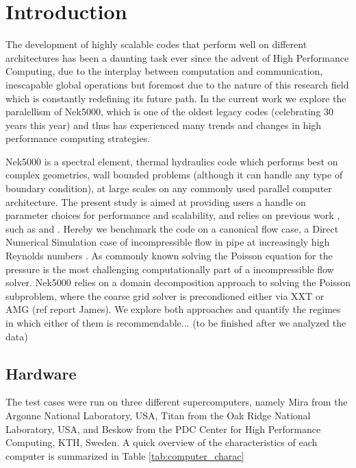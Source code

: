 \documentclass{sig-alternate}
\begin{document}
%
%

%
%
\printccsdesc



\section{Introduction}
The development of highly scalable codes that perform well on different architectures has been a daunting task ever since the advent of High Performance Computing, due to the interplay between computation and communication, inescapable global operations but foremost due to the nature of this research field which is constantly redefining its future path. In the current work we explore the paralellism of Nek5000, which is one of the oldest legacy codes (celebrating 30 years this year) and thus has experienced many trends and changes in high performance computing strategies.

Nek5000 is a spectral element, thermal hydraulics code which performs best on complex geometries, wall bounded problems (although it can handle any type of boundary condition), at large scales on any commonly used parallel computer architecture. The present study is aimed at providing users a handle on parameter choices for performance and scalability, and relies on previous work , such as \cite{fischer:scaling} and \cite{tufo:terascale}. Hereby we benchmark the code on a canonical flow case, a Direct Numerical Simulation case of incompressible flow in pipe at increasingly high Reynolds numbers \cite{Khoury2013}. As commonly known solving the Poisson equation for the pressure is the most challenging computationally part of a incompressible flow solver. Nek5000 relies on a domain decomposition approach to solving the Poisson subproblem, where the coarse grid solver is precondioned either via XXT \cite{Tufo2001151Tufo2001151} or AMG (ref report James). We explore both approaches and quantify the regimes in which either of them is recommendable... (to be finished after we analyzed the data)


\subsection{Hardware}

The test cases were run on three different supercomputers, namely Mira from the Argonne National Laboratory, USA, Titan from the Oak Ridge National Laboratory, USA, and Beskow from the PDC Center for High Performance Computing, KTH, Sweden. A quick overview of the characteristics of each computer is summarized in Table \ref{tab:computer_charac}
\end{document}
